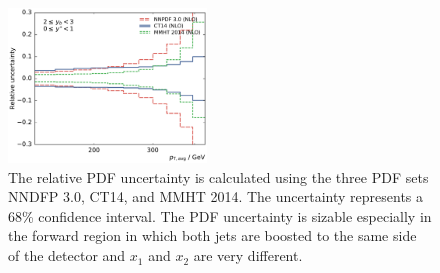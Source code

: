 \begin{figure}[htp]
    \includegraphics[width=0.47\textwidth]{figures/theory/pdf_uncert_comp_yb2ys0.pdf}
    \caption[PDF uncertainties]{The relative PDF uncertainty is calculated using the three PDF sets
    NNDFP 3.0, CT14, and MMHT 2014. The uncertainty represents a 68\% confidence
    interval. The PDF uncertainty is sizable especially in the forward region in
    which both jets  are boosted to the same side of the detector and $x_1$ and
    $x_2$ are very different.}
    \label{fig:pdf_uncertainties}
\end{figure}

